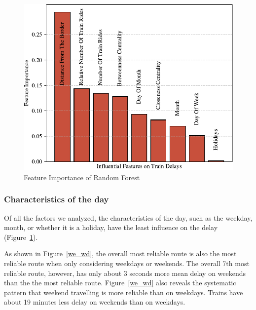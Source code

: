 \documentclass{article}
\theoremstyle{plain}
\theoremstyle{definition}
\theoremstyle{remark}
\begin{document}
	
	\begin{figure}
		\centering
		\includegraphics[width=1\linewidth]{./fig/plot_JH_01_feature_importance.pdf}
		\caption{Feature Importance of Random Forest}
		\label{feature_importance}
	\end{figure}
	
	\subsubsection{Characteristics of the day}
	
	Of all the factors we analyzed, the characteristics of the day,  such as the weekday, month, or whether it is a holiday, have the least influence on the delay (Figure~\ref{feature_importance}). 
	
	As shown in Figure~\ref{we_wd}, the overall most reliable route is also the most reliable route when only considering weekdays or weekends. The overall 7th most reliable route, however, has only about 3 seconds more mean delay on weekends than the the most reliable route. Figure~\ref{we_wd} also reveals the systematic pattern that weekend travelling is more reliable than on weekdays. Trains have about 19 minutes less delay on weekends than on weekdays.
	
\end{document}
